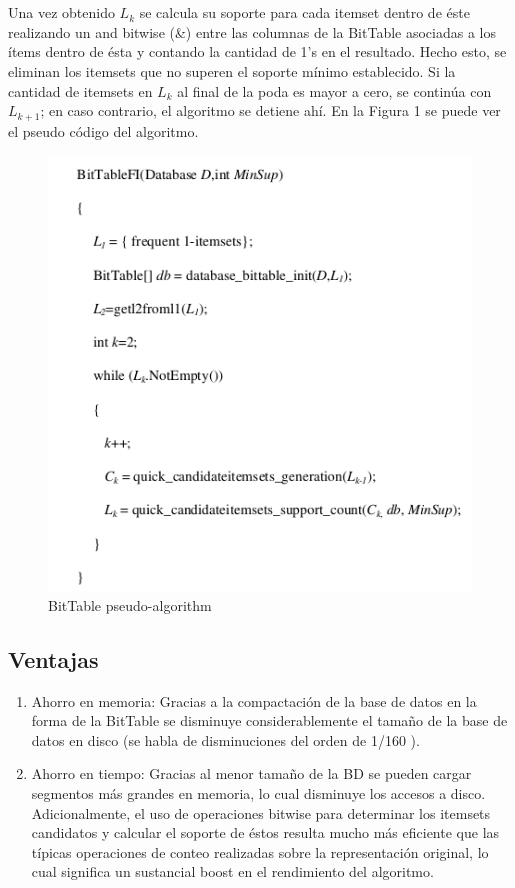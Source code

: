 \documentclass[12pt,spanish]{article}
\begin{document}
\\\\
Una vez obtenido $L_k$ se calcula su soporte para cada itemset dentro de éste realizando un and bitwise (\&) entre las columnas de la BitTable asociadas a los ítems dentro de ésta y contando la cantidad de 1's en el resultado. Hecho esto, se eliminan los itemsets que no superen el soporte mínimo establecido. Si la cantidad de itemsets en $L_k$ al final de la poda es mayor a cero, se continúa con $L_{k+1}$; en caso contrario, el algoritmo se detiene ahí. En la Figura 1 se puede ver el pseudo código del algoritmo.

\begin{figure}
\centering
\includegraphics[scale=0.8]{bittablefi.png}
\caption{BitTable pseudo-algorithm}
\end{figure}

\subsection{Ventajas}

\begin{enumerate}
\item Ahorro en memoria: Gracias a la compactación de la base de datos en la forma de la BitTable se disminuye considerablemente el tamaño de la base de datos en disco (se habla  de disminuciones del orden de 1/160 \cite{bit_table}).
\item Ahorro en tiempo: Gracias al menor tamaño de la BD se pueden cargar segmentos más grandes en memoria, lo cual disminuye los accesos a disco. Adicionalmente, el uso de operaciones bitwise para determinar los itemsets candidatos y calcular el soporte de éstos resulta mucho más eficiente que las típicas operaciones de conteo realizadas sobre la representación original, lo cual significa un sustancial boost en el rendimiento del algoritmo. 
\end{enumerate}
\end{document}

